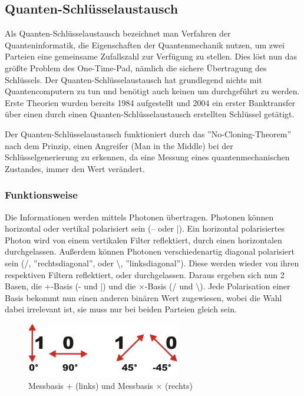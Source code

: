 \subsection{Quanten-Schlüsselaustausch}
\label{sec:Quanten-Schlusselaustausch}

Als Quanten-Schlüsselaustausch bezeichnet man Verfahren der Quanteninformatik, die Eigenschaften der Quantenmechanik nutzen, um zwei Parteien eine gemeinsame Zufallszahl zur Verfügung zu stellen.
Dies löst nun das größte Problem des One-Time-Pad, nämlich die sichere Übertragung des Schlüssels.
Der Quanten-Schlüsselaustausch hat grundlegend nichts mit Quantencomputern zu tun und benötigt auch keinen um durchgeführt zu werden.
Erste Theorien wurden bereits 1984 aufgestellt und 2004 ein erster Banktransfer über einen durch einen Quanten-Schlüsselaustausch erstellten Schlüssel getätigt. \cite{experiement_qsa}

Der Quanten-Schlüsselaustausch funktioniert durch das ''No-Cloning-Theorem'' nach dem Prinzip, einen Angreifer (Man in the Middle) bei der Schlüsselgenerierung zu erkennen, da eine Messung eines quantenmechanischen Zustandes, immer den Wert verändert.


\subsubsection{Funktionsweise}

Die Informationen werden mittels Photonen übertragen. Photonen können horizontal oder vertikal polarisiert sein (– oder |). Ein horizontal polarisiertes Photon wird von einem vertikalen Filter reflektiert, durch einen horizontalen durchgelassen.
Außerdem können Photonen verschiedenartig diagonal polarisiert sein (/, ''rechtsdiagonal'', oder \textbackslash, ''linksdiagonal''). Diese werden wieder von ihren respektiven Filtern reflektiert, oder durchgelassen.
Daraus ergeben sich nun 2 Basen, die +-Basis (- und |) und die $\times$-Basis (/ und \textbackslash).
Jede Polarisation einer Basis bekommt nun einen anderen binären Wert zugewiesen, wobei die Wahl dabei irrelevant ist, sie muss nur bei beiden Parteien gleich sein. 

\begin{figure}[!htb]
	\centering\includegraphics[width=0.6\textwidth]{images/polarisation}
	\caption{Messbasis + (links) und Messbasis $\times$ (rechts) \cite{quantenschluesselaustausch}}
	\label{fig:polarisation}
\end{figure}

